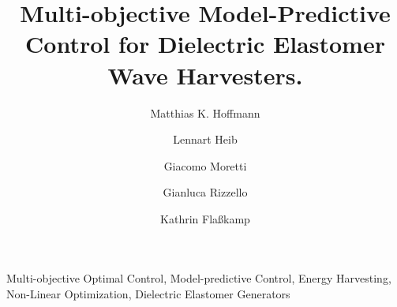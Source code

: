 \documentclass[algo2e]{ifacconf}
\begin{document}
	\begin{frontmatter}
		
		\title{Multi-objective Model-Predictive Control for Dielectric Elastomer Wave Harvesters.} 
		
		\author[First]{Matthias K. Hoffmann} 
		\author[First]{Lennart Heib} 
		\author[Second]{Giacomo Moretti}
		\author[Third]{Gianluca Rizzello}
		\author[First]{Kathrin Flaßkamp} 
		
		\address[First]{Systems Modeling and Simulation,\linebreak (e-mail:~\{{matthias.hoffmann, kathrin.flasskamp\}@uni-saarland.de, lennartheib@gmail.com})}
		\address[Second]{Università degli Studi di Trento, (e-mail:~giacomo.moretti@unitn.it)}
		\address[Third]{Intelligent Material Systems Lab,\linebreak
			(e-mail:~gianluca.rizzello@imsl.uni-saarland.de)
			\linebreak
			$^{*}$ and $^{***}$ from Saarland University, Saarbrücken, Germany.}
		
		\begin{abstract}                %
			
		\end{abstract}
		
		\begin{keyword}
			Multi-objective Optimal Control, Model-predictive Control, Energy Harvesting, Non-Linear Optimization, Dielectric Elastomer Generators
		\end{keyword}
		
	\end{frontmatter}
	
	
	
	
	
	
	
	
	
\end{document}
